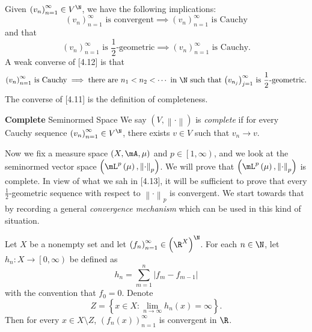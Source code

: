 \documentclass[pmath450]{subfiles}
\begin{document}
    \np Given $\left( v_{n} \right)^{\infty}_{n=1}\in V^{\N}$, we have the following implications:
    \begin{equation}
        \text{$\left( v_{n} \right)^{\infty}_{n=1}$ is convergent} \implies \text{$\left( v_{n} \right)^{\infty}_{n=1}$ is Cauchy}
    \end{equation}
    and that
    \begin{equation}
        \text{$\left( v_{n} \right)^{\infty}_{n=1}$ is $\frac{1}{2}$-geometric} \implies \text{$\left( v_{n} \right)^{\infty}_{n=1}$ is Cauchy}.
    \end{equation}
    A weak converse of [4.12] is that
    \begin{equation}
        \text{$\left( v_{n} \right)^{\infty}_{n=1}$ is Cauchy}\implies\text{there are $n_1<n_2<\cdots$ in $\N$ such that $\left( v_{n_j} \right)^{\infty}_{j=1}$ is $\frac{1}{2}$-geometric}.
    \end{equation}
    The converse of [4.11] is the definition of completeness.

    \begin{definition}{\textbf{Complete} Seminormed Space}
        We say $\left( V,\left\lVert \cdot\right\rVert \right)$ is \emph{complete} if for every Cauchy sequence $\left( v_{n} \right)^{\infty}_{n=1}\in V^{\N}$, there exists $v\in V$ such that $v_n\to v$.
    \end{definition}
    
    \np Now we fix a measure space $\left( X,\mA,\mu \right)$ and $p\in\left[ 1,\infty \right)$, and we look at the seminormed vector space $\left( \lp\left( \mu \right),\left\lVert \cdot\right\rVert_p \right)$. We will prove that $\left( \lp\left( \mu \right),\left\lVert \cdot\right\rVert_p \right)$ is complete. In view of what we sah in [4.13], it will be sufficient to prove that every $\frac{1}{2}$-geometric sequence with respect to $\left\lVert \cdot\right\rVert_p$ is convergent. We start towards that by recording a general \textit{convergence mechanism} which can be used in this kind of situation.

    \begin{lemma}{}
        Let $X$ be a nonempty set and let $\left( f_{n} \right)^{\infty}_{n=1}\in \left( \R^X \right)^{\N}$. For each $n\in\N$, let $h_n:X\to\left[ 0,\infty \right)$ be defined as
        \begin{equation*}
            h_n = \sum^{n}_{m=1} \left| f_m-f_{m-1} \right|
        \end{equation*}
        with the convention that $f_0=0$. Denote
        \begin{equation*}
            Z = \left\lbrace x\in X: \lim_{n\to\infty}h_n\left( x \right)=\infty \right\rbrace.
        \end{equation*}
        Then for every $x\in X\setminus Z$, $\left( f_{n}\left( x \right) \right)^{\infty}_{n=1}$ is convergent in $\R$.
    \end{lemma}
    
\end{document}
